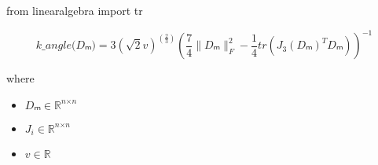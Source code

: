 \documentclass[12pt]{article}
\begin{document}
from linearalgebra import tr

\[
\textit{k\_angle(Dₘ)} = 3( \sqrt{2}\textit{v})^{(\frac{2}{3})}(\frac{7}{4}\|\textit{Dₘ}\|_F^{2} - \frac{1}{4}tr(\textit{J}_{ 3 }(\textit{Dₘ})^T\textit{Dₘ}))^{-1}
\]

where
\begin{itemize}
\item $\textit{Dₘ} \in \mathbb{R}^{ \textit{n} \times \textit{n} }$
\item $\textit{J}_{\textit{i}} \in \mathbb{R}^{ \textit{n} \times \textit{n} }$
\item $\textit{v} \in \mathbb{{R}}$
\end{itemize}
\end{document}

